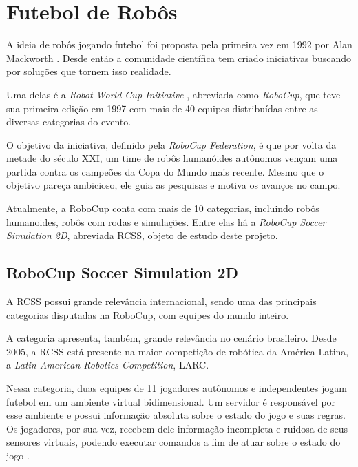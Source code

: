 \section{Futebol de Robôs}
\par A ideia de robôs jogando futebol foi proposta pela primeira vez em 1992 por Alan Mackworth \cite{mackworth1993seeing}. Desde então a comunidade científica tem criado iniciativas buscando por soluções que tornem isso realidade.
\par Uma delas é a \textit{Robot World Cup Initiative} \cite{robocup-initiative}, abreviada como \textit{RoboCup}, que teve sua primeira edição em 1997 com mais de 40 equipes distribuídas entre as diversas categorias do evento.
\par O objetivo da iniciativa, definido pela \textit{RoboCup Federation}, é que por volta da metade do século XXI, um time de robôs humanóides autônomos vençam uma partida contra os campeões da Copa do Mundo mais recente. Mesmo que o objetivo pareça ambicioso, ele guia as pesquisas e motiva os avanços no campo.
\par Atualmente, a RoboCup conta com mais de 10 categorias, incluindo robôs humanoides, robôs com rodas e simulações. Entre elas há a \textit{RoboCup Soccer Simulation 2D}, abreviada RCSS, objeto de estudo deste projeto.

\subsection{RoboCup Soccer Simulation 2D}
\par A RCSS possui grande relevância internacional, sendo uma das principais categorias disputadas na RoboCup, com equipes do mundo inteiro.
\par A categoria apresenta, também, grande relevância no cenário brasileiro.
Desde 2005, a RCSS está presente na maior competição de robótica da América Latina, a \textit{Latin American Robotics Competition}, LARC.
\par Nessa categoria, duas equipes de 11 jogadores autônomos e independentes jogam futebol em um ambiente virtual bidimensional. Um servidor é responsável por esse ambiente e possui informação absoluta sobre o estado do jogo e suas regras. Os jogadores, por sua vez, recebem dele informação incompleta e ruidosa de seus sensores virtuais, podendo executar comandos a fim de atuar sobre o estado do jogo \cite{rcssmanual2003}.


